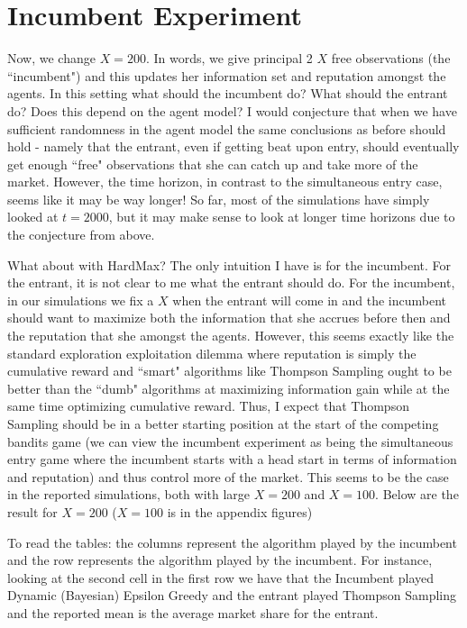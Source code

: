 \documentclass[11pt,letterpaper]{article}
\begin{document}
\section*{Incumbent Experiment}
Now, we change $X = 200$. In words, we give principal 2 $X$ free observations (the ``incumbent") and this updates her information set and reputation amongst the agents. In this setting what should the incumbent do? What should the entrant do? Does this depend on the agent model? I would conjecture that when we have sufficient randomness in the agent model the same conclusions as before should hold - namely that the entrant, even if getting beat upon entry, should eventually get enough ``free" observations that she can catch up and take more of the market. However, the time horizon, in contrast to the simultaneous entry case, seems like it may be way longer! So far, most of the simulations have simply looked at $t = 2000$, but it may make sense to look at longer time horizons due to the conjecture from above. \\
\vspace{0.25cm}

What about with HardMax? The only intuition I have is for the incumbent. For the entrant, it is not clear to me what the entrant should do. For the incumbent, in our simulations we fix a $X$ when the entrant will come in and the incumbent should want to maximize both the information that she accrues before then and the reputation that she amongst the agents. However, this seems exactly like the standard exploration exploitation dilemma where reputation is simply the cumulative reward and ``smart" algorithms like Thompson Sampling ought to be better than the ``dumb" algorithms at maximizing information gain while at the same time optimizing cumulative reward. Thus, I expect that Thompson Sampling should be in a better starting position at the start of the competing bandits game (we can view the incumbent experiment as being the simultaneous entry game where the incumbent starts with a head start in terms of information and reputation) and thus control more of the market. This seems to be the case in the reported simulations, both with large $X = 200$ and $X = 100$. Below are the result for $X = 200$ ($X = 100$ is in the appendix figures)

To read the tables: the columns represent the algorithm played by the incumbent and the row represents the algorithm played by the incumbent. For instance, looking at the second cell in the first row we have that the Incumbent played Dynamic (Bayesian) Epsilon Greedy and the entrant played Thompson Sampling and the reported mean is the average market share for the entrant.
\end{document}
